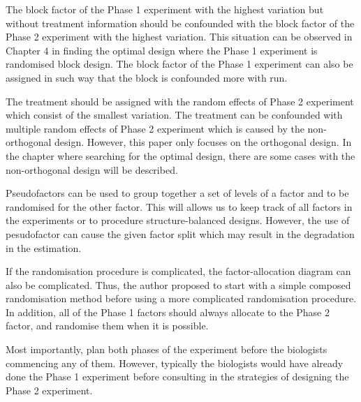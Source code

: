 \documentclass[11pt,a4paper]{article}
\begin{document}
The block factor of the Phase 1 experiment with the highest variation but without treatment information should be confounded with the block factor of the Phase 2 experiment with the highest variation. This situation can be observed in Chapter 4 in finding the optimal design where the Phase 1 experiment is randomised block design. The block factor of the Phase 1 experiment can also be assigned in such way that the block is confounded more with run. 

The treatment should be assigned with the random effects of Phase 2 experiment which consist of the smallest variation.  The treatment can be confounded with multiple random effects of Phase 2 experiment which is caused by the non-orthogonal design. However, this paper only focuses on the orthogonal design. In the chapter where searching for the optimal design, there are some cases with the  non-orthogonal design will be described.

Pseudofactors can be used to group together a set of levels of a factor and to be randomised for the other factor.  This will allows us to keep track of all factors in the experiments or to procedure structure-balanced designs. However, the use of pesudofactor can cause the given factor split which may result in the degradation in the estimation.

If the randomisation procedure is complicated, the factor-allocation diagram can also be complicated. Thus, the author proposed to start with a simple composed randomisation method before using a more complicated randomisation procedure. In addition, all of the Phase 1 factors should always allocate to the Phase 2 factor, and randomise them when it is possible. 

Most importantly, plan both phases of the experiment before the biologists commencing any of them. However, typically the biologists would have already done the Phase 1 experiment before consulting in the strategies of designing the Phase 2 experiment. 
\end{document}
